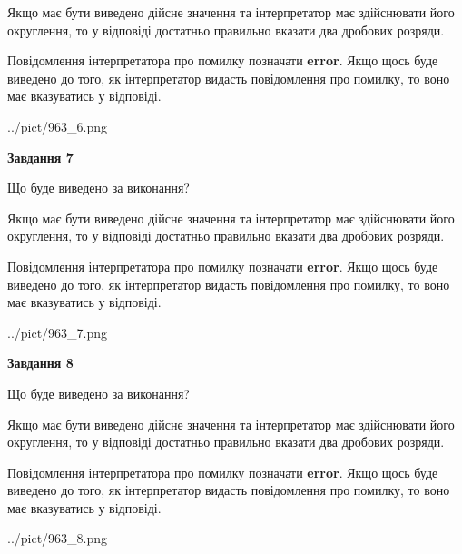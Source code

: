 \documentclass[12pt, ukrainian]{article}
\begin{document}
{\begin {Large}
Якщо має бути виведено дійсне значення та інтерпретатор має здійснювати його округлення, 
то у відповіді достатньо правильно вказати два дробових розряди.

Повідомлення інтерпретатора про помилку позначати \textbf{error}.
Якщо щось буде виведено до того, як інтерпретатор видасть повідомлення про помилку, 
то воно має вказуватись у відповіді. \par

\begin{center}
	{../pict/963_6.png}
\end{center}
\newpage

{\begin {center}\textbf{Завдання 7}\end {center}}\par
Що буде виведено за виконання? \par

Якщо має бути виведено дійсне значення та інтерпретатор має здійснювати його округлення, 
то у відповіді достатньо правильно вказати два дробових розряди.

Повідомлення інтерпретатора про помилку позначати \textbf{error}.
Якщо щось буде виведено до того, як інтерпретатор видасть повідомлення про помилку, 
то воно має вказуватись у відповіді. \par

\begin{center}
	{../pict/963_7.png}
\end{center}
\newpage

{\begin {center}\textbf{Завдання 8}\end {center}}\par
Що буде виведено за виконання? \par

Якщо має бути виведено дійсне значення та інтерпретатор має здійснювати його округлення, 
то у відповіді достатньо правильно вказати два дробових розряди.

Повідомлення інтерпретатора про помилку позначати \textbf{error}.
Якщо щось буде виведено до того, як інтерпретатор видасть повідомлення про помилку, 
то воно має вказуватись у відповіді. \par

\begin{center}
	{../pict/963_8.png}
\end{center}
\newpage


\end{Large}}
\end{document}
